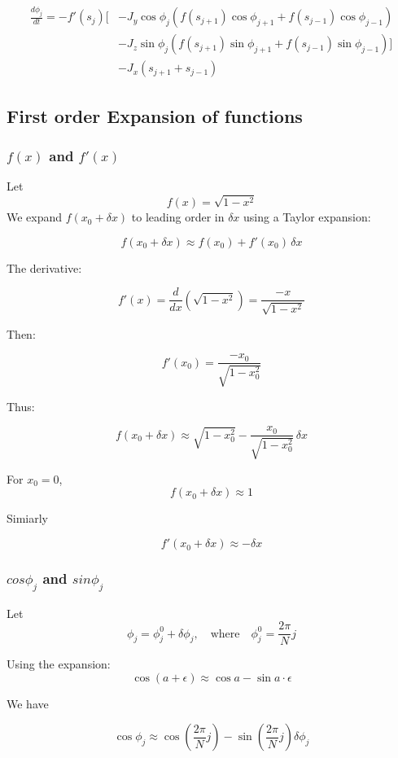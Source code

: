 \documentclass{article}
\begin{document}
\begin{align*}
    \frac{d\phi_j}{dt} = -f'(s_j)[&-J_y\cos\phi_j(f(s_{j+1})\cos\phi_{j+1} + f(s_{j-1})\cos\phi_{j-1}) \\
                                  &-J_z\sin\phi_j(f(s_{j+1})\sin\phi_{j+1} + f(s_{j-1})\sin\phi_{j-1})] \\
                                  &-J_x(s_{j+1} + s_{j-1})
\end{align*}

\subsection{First order Expansion of functions}
\subsubsection{$f(x)$ and $f'(x)$}
Let 
\[
f(x) = \sqrt{1 - x^2}
\]
We expand \( f(x_0 + \delta x) \) to leading order in \( \delta x \) using a Taylor expansion:

\[
f(x_0 + \delta x) \approx f(x_0) + f'(x_0) \, \delta x
\]

The derivative:

\[
f'(x) = \frac{d}{dx} \left( \sqrt{1 - x^2} \right) = \frac{-x}{\sqrt{1 - x^2}}
\]

Then:

\[
f'(x_0) = \frac{-x_0}{\sqrt{1 - x_0^2}}
\]

Thus:

\[
f(x_0 + \delta x) \approx \sqrt{1 - x_0^2} - \frac{x_0}{\sqrt{1 - x_0^2}} \, \delta x
\]

For $x_0 = 0$, \[\boxed{f(x_0 + \delta x) \approx 1}\]

Simiarly

\[\boxed{f'(x_0 + \delta x) \approx -\delta x}\]

\subsubsection{$cos\phi_j$ and $sin\phi_j$}

Let
\[
\phi_j = \phi_j^0 + \delta \phi_j, \quad \text{where} \quad \phi_j^0 = \frac{2\pi}{N} j
\]

Using the expansion:
\[
\cos(a + \epsilon) \approx \cos a - \sin a \cdot \epsilon
\]

We have 

\[
\boxed{
\cos\phi_j \approx \cos( \frac{2\pi}{N}j) - \sin( \frac{2\pi}{N}j)\delta\phi_j
}
\]
\end{document}
